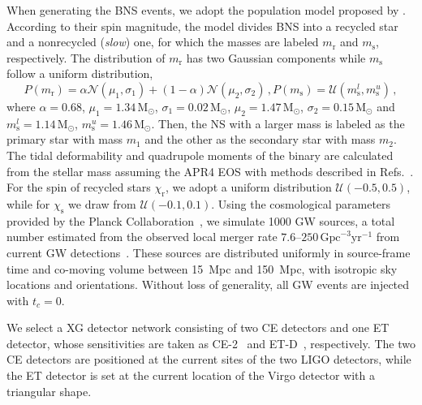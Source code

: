 \documentclass[a4paper,11pt]{article}
\begin{document}
When generating the BNS events, we adopt the population model proposed by \citet{Farrow:2019xnc}. 
According to their spin magnitude, the model divides BNS into a recycled star and a nonrecycled 
(\emph{slow}) one, for which the masses are labeled $m_{\mathrm{r}}$ and $m_{\mathrm{s}}$, respectively. 
The distribution of $m_{\mathrm{r}}$ has two Gaussian components while $m_{\mathrm{s}}$ follow a uniform distribution,
\begin{subequations}
\label{mass population}
\begin{equation}
    P(m_{\mathrm{r}}) = \alpha \mathcal{N}(\mu_1, \sigma_1) + (1-\alpha) \mathcal{N}(\mu_2, \sigma_2)\,,
\end{equation}
\begin{equation}
    P(m_{\mathrm{s}}) = \mathcal{U}(m_{\mathrm{s}}^l, m_{\mathrm{s}}^u)\,,
\end{equation}
\end{subequations}
where $\alpha=0.68$, $\mu_1=1.34\,\mathrm{M}_{\odot}$, $\sigma_1=0.02\,\mathrm{M}_
{\odot}$, $\mu_2=1.47\,\mathrm{M}_{\odot}$, $\sigma_2=0.15\,\mathrm{M}_{\odot}$ 
and $m_{\mathrm{s}}^l=1.14\,\mathrm{M}_{\odot}$, $m_{\mathrm{s}}^u=1.46\,\mathrm{M}_{\odot}$. Then, the NS with a larger mass is labeled as the primary star with mass $m_1$ and the other as the secondary star with mass $m_2$.
The tidal deformability and quadrupole moments of the binary are calculated from 
the stellar mass assuming the APR4 EOS with methods described in Refs.~\cite{Yagi:2013awa,Atta:2024ckt}. For the spin of recycled stars $\chi_{\mathrm{r}}$, we adopt a uniform distribution $\mathcal{U}(-0.5,0.5)$, 
while for $\chi_{\mathrm{s}}$ we draw from $\mathcal{U}(-0.1,0.1)$.
Using the cosmological parameters provided by the Planck Collaboration~\cite{Planck:2018vyg}, 
we simulate 1000 GW sources, a total number estimated from the observed local merger rate 
$7.6$--$250\,\mathrm{Gpc}^{-3}\mathrm{yr}^{-1}$ from current GW detections~\cite{LIGOScientific:2025pvj,LIGOScientific:2020aai}. 
These sources are distributed uniformly in source-frame time and co-moving volume between 15~Mpc and 150~Mpc, 
with isotropic sky locations and orientations. Without loss of generality, all GW events are injected with $t_{c}=0$.

We select a XG detector network consisting of two CE detectors and one ET 
detector, whose sensitivities are taken as CE-2~\cite{Reitze:2019iox,Reitze:2019dyk} 
and ET-D~\cite{Punturo:2010zz,Hild:2010id,Sathyaprakash:2012jk}, respectively. 
The two CE detectors are positioned at the current sites of the two LIGO detectors, 
while the ET detector is set at the current location of the Virgo detector with a triangular shape. 
\end{document}

